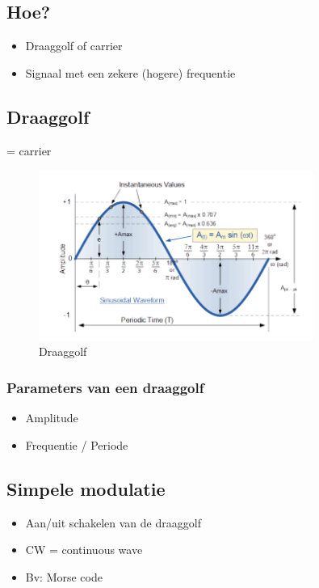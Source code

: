 \documentclass{article}
\begin{document}
\subsection{Hoe?}
\begin{itemize}
    \item Draaggolf of carrier
    \item Signaal met een zekere (hogere) frequentie
\end{itemize}

\subsection{Draaggolf}
= carrier

\begin{figure}[H]
    \centering
    \includegraphics[width=0.8\textwidth]{Screenshot_20200302_115827.png}
    \caption{Draaggolf}
\end{figure}

\subsubsection{Parameters van een draaggolf}

\begin{itemize}
    \item Amplitude
    \item Frequentie / Periode
\end{itemize}

\subsection{Simpele modulatie}
\begin{itemize}
    \item Aan/uit schakelen van de draaggolf
    \item CW = continuous wave
    \item Bv: Morse code
\end{itemize}
\end{document}

